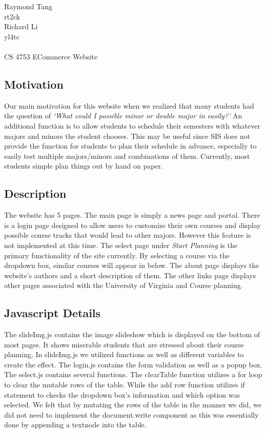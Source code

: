 \documentclass{article}
\begin{document}
\begin{singlespace}
\noindent Raymond Tang\\
rt2ck\\
Richard Li\\
yl4tc\\
\\
CS 4753 ECommerce Website\\
\end{singlespace}

\begin{doublespace}
\subsection*{Motivation}
Our main motivation for this website when we realized that many students had the question of \emph{`What could I possible minor or double major in easily?'}
An additional function is to allow students to schedule their semesters with whatever majors and minors the student chooses.
This may be useful since SIS does not provide the function for students to plan their schedule in advance, especially to easily test multiple majors/minors and combinations of them.
Currently, most students simple plan things out by hand on paper.

\subsection*{Description}
The website has 5 pages. The main page is simply a news page and portal. There is a login page designed to allow users to customize their own courses and display possible course tracks that would lead to other majors. However this feature is not implemented at this time. The select page under \emph{Start Planning} is the primary functionality of the site currently. By selecting a course via the dropdown box, similar courses will appear in below. The about page displays the website's authors and a short description of them. The other links page displays other pages associated with the University of Virginia and Course planning.

\subsection*{Javascript Details}
The slideImg.js contains the image slideshow which is displayed on the bottom of most pages. It shows miserable students that are stressed about their course planning. In slideImg.js we utilized functions as well as different variables to create the effect.
The login.js contains the form validation as well as a popup box.
The select.js contains several functions. The clearTable function utilizes a for loop to clear the mutable rows of the table. While the add row function utilizes if statement to checks the dropdown box's information and which option was selected. We felt that by mutating the rows of the table in the manner we did, we did not need to implement the document.write component as this was essentially done by appending a textnode into the table.


\end{doublespace}
\end{document}
